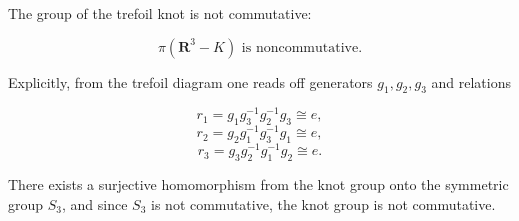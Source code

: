 The group of the trefoil knot is not commutative:

$$\pi(\mathbf{R}^3 - K) \text{ is noncommutative}.$$

Explicitly, from the trefoil diagram one reads off generators $g_1, g_2, g_3$ and relations

$$r_1 = g_1 g_3^{-1} g_2^{-1} g_3 \cong e,$$
$$r_2 = g_2 g_1^{-1} g_3^{-1} g_1 \cong e,$$
$$r_3 = g_3 g_2^{-1} g_1^{-1} g_2 \cong e.$$

There exists a surjective homomorphism from the knot group onto the symmetric group $S_3$, and since $S_3$ is not commutative, the knot group is not commutative.
